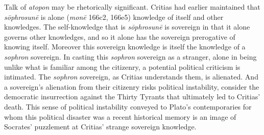 Talk of \emph{atopon} may be rhetorically significant. Critias had earlier maintained that \emph{sōphrosunē} is alone (\emph{monē} 166c2, 166e5) knowledge of itself and other knowledges. The self-knowledge that is \emph{sōphrosunē} is sovereign in that it alone governs other knowledges, and so it alone has the sovereign prerogative of knowing itself. Moreover this sovereign knowledge is itself the knowledge of a \emph{sophron} sovereign. In casting this \emph{sophron} sovereign as a stranger, alone in being unlike what is familiar among the citizenry, a potential political criticism is intimated. The \emph{sophron} sovereign, as Critias understands them, is alienated. And a sovereign's alienation from their citizenry risks political instability, consider the democratic insurrection against the Thirty Tyrants that ultimately led to Critias' death. This sense of political instability conveyed to Plato's contemporaries for whom this political disaster was a recent historical memory is an image of Socrates' puzzlement at Critias' strange sovereign knowledge.

